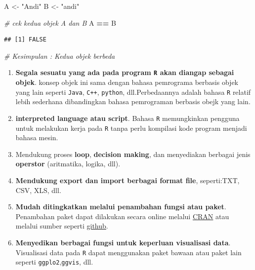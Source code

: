 \documentclass[]{book}
\newenvironment{Shaded}{\begin{snugshade}}{\end{snugshade}}
\newcommand{\CommentTok}[1]{\textcolor[rgb]{0.56,0.35,0.01}{\textit{#1}}}
\newcommand{\NormalTok}[1]{#1}
\newcommand{\OperatorTok}[1]{\textcolor[rgb]{0.81,0.36,0.00}{\textbf{#1}}}
\newcommand{\StringTok}[1]{\textcolor[rgb]{0.31,0.60,0.02}{#1}}
\providecommand{\tightlist}{%
  \setlength{\itemsep}{0pt}\setlength{\parskip}{0pt}}
\theoremstyle{definition}
\theoremstyle{definition}
\theoremstyle{definition}
\theoremstyle{remark}
\begin{document}
\begin{Shaded}
\begin{Highlighting}[]
\NormalTok{A <-}\StringTok{ "Andi"}
\NormalTok{B <-}\StringTok{ "andi"}

\CommentTok{# cek kedua objek A dan B}
\NormalTok{A }\OperatorTok{==}\StringTok{ }\NormalTok{B}
\end{Highlighting}
\end{Shaded}

\begin{verbatim}
## [1] FALSE
\end{verbatim}

\begin{Shaded}
\begin{Highlighting}[]
\CommentTok{# Kesimpulan : Kedua objek berbeda}
\end{Highlighting}
\end{Shaded}

\begin{enumerate}
\def\labelenumi{\arabic{enumi}.}
\setcounter{enumi}{1}
\tightlist
\item
  \textbf{Segala sesuatu yang ada pada program \texttt{R} akan diangap sebagai objek}. konsep objek ini sama dengan bahasa pemrograma berbasis objek yang lain seperti \texttt{Java}, \texttt{C++}, \texttt{python}, dll.Perbedaannya adalah bahasa \texttt{R} relatif lebih sederhana dibandingkan bahasa pemrograman berbasis obejk yang lain.
\item
  \textbf{interpreted language atau script}. Bahasa \texttt{R} memungkinkan pengguna untuk melakukan kerja pada \texttt{R} tanpa perlu kompilasi kode program menjadi bahasa mesin.
\item
  Mendukung proses \textbf{loop}, \textbf{decision making}, dan menyediakan berbagai jenis \textbf{operstor} (aritmatika, logika, dll).
\item
  \textbf{Mendukung export dan import berbagai format file}, seperti:TXT, CSV, XLS, dll.
\item
  \textbf{Mudah ditingkatkan melalui penambahan fungsi atau paket}. Penambahan paket dapat dilakukan secara online melalui \href{https://cran.r-project.org/}{CRAN} atau melalui sumber seperti \href{https://github.com/}{github}.
\item
  \textbf{Menyedikan berbagai fungsi untuk keperluan visualisasi data}. Visualisasi data pada \texttt{R} dapat menggunakan paket bawaan atau paket lain seperti \texttt{ggplo2},\texttt{ggvis}, dll.
\end{enumerate}
\end{document}
